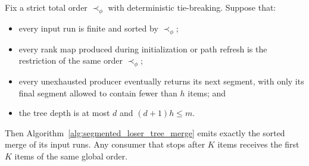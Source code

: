 \begin{theorem}
\label{thm:segment-global-order}
Fix a strict total order $\prec_\phi$ with deterministic tie-breaking.
Suppose that:
\begin{itemize}
  \item[(A1)] every input run is finite and sorted by $\prec_\phi$;
  \item[(A2)] every rank map produced during initialization or path
        refresh is the restriction of the same order $\prec_\phi$;
  \item[(A3)] every unexhausted producer eventually returns its next
        segment, with only its final segment allowed to contain fewer
        than $h$ items; and
  \item[(A4)] the tree depth is at most $d$ and $(d+1)h\le m$.
\end{itemize}
Then Algorithm~\ref{alg:segmented_loser_tree_merge} emits exactly the
sorted merge of its input runs. Any consumer that stops after $K$ items
receives the first $K$ items of the same global order.
\end{theorem}

